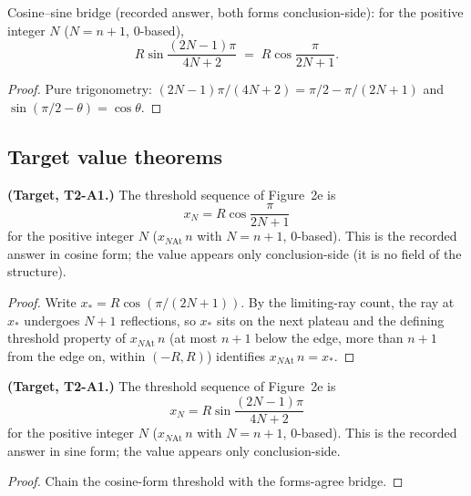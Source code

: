 \begin{theorem}
\label{thm:IPhO2026Problems_problem_IPhO_2026_2_A_1:threshold_forms_agree}
Cosine--sine bridge (recorded answer, both forms conclusion-side): for the
positive integer $N$ ($N = n + 1$, $0$-based),
\[
R\sin\!\frac{(2N-1)\pi}{4N+2} \;=\; R\cos\!\frac{\pi}{2N+1} .
\]
\end{theorem}
\begin{proof}
Pure trigonometry: $(2N-1)\pi/(4N+2) = \pi/2 - \pi/(2N+1)$ and
$\sin(\pi/2 - \theta) = \cos\theta$.
\end{proof}

\subsection*{Target value theorems}

\begin{theorem}
\label{thm:IPhO2026Problems_problem_IPhO_2026_2_A_1:threshold_x_N_cos}
\textbf{(Target, T2-A1.)}  The threshold sequence of Figure~2e is
\[
x_N = R\cos\!\frac{\pi}{2N+1}
\]
for the positive integer $N$ ($x_{N\mathrm{At}}\,n$ with $N = n + 1$,
$0$-based).  This is the recorded answer in cosine form; the value appears
only conclusion-side (it is no field of the structure).
\end{theorem}
\begin{proof}
Write $x_* = R\cos(\pi/(2N+1))$.  By the limiting-ray count, the ray at
$x_*$ undergoes $N + 1$ reflections, so $x_*$ sits on the next plateau and
the defining threshold property of $x_{N\mathrm{At}}\,n$ (at most $n + 1$
below the edge, more than $n + 1$ from the edge on, within $(-R, R)$)
identifies $x_{N\mathrm{At}}\,n = x_*$.
\end{proof}

\begin{theorem}
\label{thm:IPhO2026Problems_problem_IPhO_2026_2_A_1:threshold_x_N_sin}
\textbf{(Target, T2-A1.)}  The threshold sequence of Figure~2e is
\[
x_N = R\sin\!\frac{(2N-1)\pi}{4N+2}
\]
for the positive integer $N$ ($x_{N\mathrm{At}}\,n$ with $N = n + 1$,
$0$-based).  This is the recorded answer in sine form; the value appears
only conclusion-side.
\end{theorem}
\begin{proof}
Chain the cosine-form threshold with the forms-agree bridge.
\end{proof}

